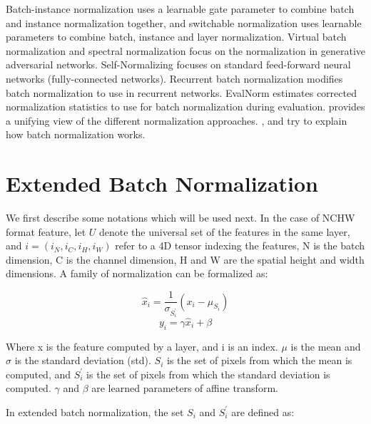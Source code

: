 \documentclass[runningheads]{llncs}
\begin{document}
Batch-instance normalization \cite{nam2018batch} uses a learnable gate parameter to combine batch and instance normalization together, and switchable normalization \cite{luo2018differentiable}  uses learnable parameters to combine batch, instance and layer normalization.
Virtual batch normalization \cite{salimans2016improved} and spectral normalization \cite{miyato2018spectral} focus on the normalization in generative adversarial networks. 
Self-Normalizing \cite{klambauer2017self} focuses on standard feed-forward neural networks (fully-connected networks).
Recurrent batch normalization \cite{cooijmans2016recurrent} modifies batch normalization to use in recurrent networks. 
EvalNorm \cite{singh2019evalnorm} estimates corrected normalization statistics to use for batch normalization during evaluation. \cite{ren2016normalizing} provides a unifying view of the different normalization approaches. 
\cite{santurkar2018does}, \cite{luo2018towards} and \cite{bjorck2018understanding} try to explain how batch normalization works.


\section{Extended Batch Normalization}
We first describe some notations which will be used next. In the case of NCHW format feature, let $U$ denote the universal set of the features in the same layer, and $i=(i_N,i_C,i_H,i_W)$ refer to a 4D tensor indexing the features, N is the batch dimension, C is the channel dimension, H and W are the spatial height and width dimensions. A family of normalization can be formalized as:

\begin{equation} \label{norm_eq}
\widehat{x}_{i}=\frac{1}{\sigma_{S_{i}^{'}}}(x_{i}-\mu_{S_{i}})
\end{equation}
\begin{equation} \label{affine_eq}
y_{i}=\gamma \widehat{x}_{i} + \beta
\end{equation}

Where x is the feature computed by a layer, and i is an index. 
$\mu$ is the mean and $\sigma$ is the standard deviation (std). $S_{i}$ is the set of pixels from which the mean is computed, and $ S_{i}^{'}$ is the set of pixels from which the standard deviation is computed. $\gamma$ and $\beta$ are learned parameters of affine transform.

In extended batch normalization, the set $S_{i}$ and $S_{i}^{'}$ are defined as:
\end{document}
